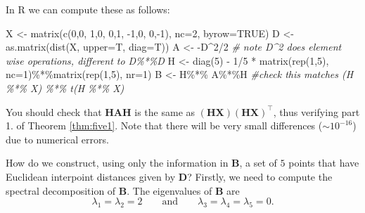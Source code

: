 \documentclass[
]{book}
\newenvironment{Shaded}{\begin{snugshade}}{\end{snugshade}}
\newcommand{\AttributeTok}[1]{\textcolor[rgb]{0.77,0.63,0.00}{#1}}
\newcommand{\CommentTok}[1]{\textcolor[rgb]{0.56,0.35,0.01}{\textit{#1}}}
\newcommand{\ConstantTok}[1]{\textcolor[rgb]{0.00,0.00,0.00}{#1}}
\newcommand{\DecValTok}[1]{\textcolor[rgb]{0.00,0.00,0.81}{#1}}
\newcommand{\FunctionTok}[1]{\textcolor[rgb]{0.00,0.00,0.00}{#1}}
\newcommand{\NormalTok}[1]{#1}
\newcommand{\OtherTok}[1]{\textcolor[rgb]{0.56,0.35,0.01}{#1}}
\newcommand{\SpecialCharTok}[1]{\textcolor[rgb]{0.00,0.00,0.00}{#1}}
\theoremstyle{definition}
\theoremstyle{definition}
\theoremstyle{definition}
\theoremstyle{definition}
\theoremstyle{remark}
\begin{document}
In R we can compute these as follows:

\begin{Shaded}
\begin{Highlighting}[]
\NormalTok{X }\OtherTok{\textless{}{-}} \FunctionTok{matrix}\NormalTok{(}\FunctionTok{c}\NormalTok{(}\DecValTok{0}\NormalTok{,}\DecValTok{0}\NormalTok{,}
              \DecValTok{1}\NormalTok{,}\DecValTok{0}\NormalTok{,}
              \DecValTok{0}\NormalTok{,}\DecValTok{1}\NormalTok{,}
              \SpecialCharTok{{-}}\DecValTok{1}\NormalTok{,}\DecValTok{0}\NormalTok{,}
              \DecValTok{0}\NormalTok{,}\SpecialCharTok{{-}}\DecValTok{1}\NormalTok{), }\AttributeTok{nc=}\DecValTok{2}\NormalTok{, }\AttributeTok{byrow=}\ConstantTok{TRUE}\NormalTok{)}
\NormalTok{D }\OtherTok{\textless{}{-}} \FunctionTok{as.matrix}\NormalTok{(}\FunctionTok{dist}\NormalTok{(X, }\AttributeTok{upper=}\NormalTok{T, }\AttributeTok{diag=}\NormalTok{T))}
\NormalTok{A }\OtherTok{\textless{}{-}} \SpecialCharTok{{-}}\NormalTok{D}\SpecialCharTok{\^{}}\DecValTok{2}\SpecialCharTok{/}\DecValTok{2} 
\CommentTok{\# note D\^{}2 does element wise operations, different to D\%*\%D}
\NormalTok{H }\OtherTok{\textless{}{-}} \FunctionTok{diag}\NormalTok{(}\DecValTok{5}\NormalTok{) }\SpecialCharTok{{-}} \DecValTok{1}\SpecialCharTok{/}\DecValTok{5} \SpecialCharTok{*} \FunctionTok{matrix}\NormalTok{(}\FunctionTok{rep}\NormalTok{(}\DecValTok{1}\NormalTok{,}\DecValTok{5}\NormalTok{), }\AttributeTok{nc=}\DecValTok{1}\NormalTok{)}\SpecialCharTok{\%*\%}\FunctionTok{matrix}\NormalTok{(}\FunctionTok{rep}\NormalTok{(}\DecValTok{1}\NormalTok{,}\DecValTok{5}\NormalTok{), }\AttributeTok{nr=}\DecValTok{1}\NormalTok{)}
\NormalTok{B }\OtherTok{\textless{}{-}}\NormalTok{ H}\SpecialCharTok{\%*\%}\NormalTok{ A}\SpecialCharTok{\%*\%}\NormalTok{H }\CommentTok{\#check this matches  (H \%*\% X) \%*\% t(H \%*\% X)}
\end{Highlighting}
\end{Shaded}

You should check that \(\mathbf H\mathbf A\mathbf H\) is the same as \((\mathbf H\mathbf X)(\mathbf H\mathbf X)^\top\), thus verifying part 1. of Theorem \ref{thm:five1}. Note that there will be very small differences (\(\sim 10^{-16}\)) due to numerical errors.

How do we construct, using only the information in \(\mathbf B\), a set of \(5\) points that have Euclidean interpoint distances given by \(\mathbf D\)?
Firstly, we need to compute the spectral decomposition of \(\mathbf B\). The eigenvalues of \(\mathbf B\) are
\[
\lambda_1=\lambda_2=2 \qquad \text{and} \qquad \lambda_3=\lambda_4=\lambda_5=0.
\]
\end{document}
